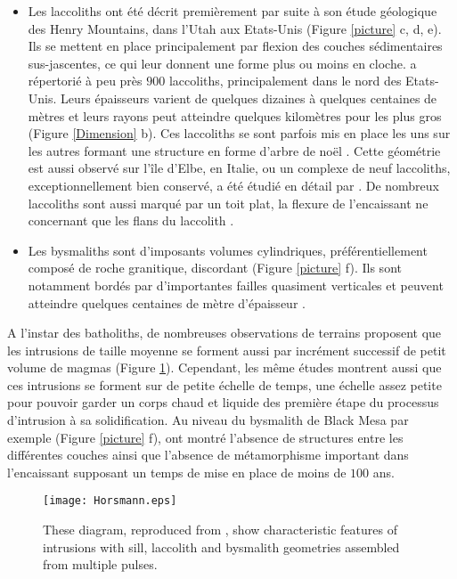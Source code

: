 \begin{itemize}
\item    Les   laccoliths    ont   été    décrit   premièrement    par
  \citet{Gilbert:1877uk}  suite  à  son  étude  géologique  des  Henry
  Mountains, dans  l'Utah aux  Etats-Unis (Figure \ref{picture}  c, d,
  e).  Ils se mettent en  place principalement par flexion des couches
  sédimentaires sus-jascentes, ce  qui leur donnent une  forme plus ou
  moins en  cloche.  \citet{E:2015tl}  a répertorié  à peu  près $900$
  laccoliths,  principalement  dans  le nord  des  Etats-Unis.   Leurs
  épaisseurs  varient de  quelques  dizaines à  quelques centaines  de
  mètres et leurs  rayons peut atteindre quelques  kilomètres pour les
  plus  gros  (Figure  \ref{Dimension}  b).  Ces  laccoliths  se  sont
  parfois mis en place les uns sur les autres formant une structure en
  forme d'arbre  de noël \citep{E:2015tl}.  Cette  géométrie est aussi
  observé  sur  l'île  d'Elbe,  en  Italie, ou  un  complexe  de  neuf
  laccoliths, exceptionnellement bien conservé, a été étudié en détail
  par \citet{Rocchi:2002jy}. De nombreux  laccoliths sont aussi marqué
  par un toit  plat, la flexure de l'encaissant ne  concernant que les
  flans du laccolith \citep{Koch:1981if}.

\item   Les   bysmaliths   sont  d'imposants   volumes   cylindriques,
  préférentiellement composé  de roche granitique,  discordant (Figure
  \ref{picture}  f).   Ils  sont notamment  bordés  par  d'importantes
  failles quasiment verticales et peuvent atteindre quelques centaines
  de mètre d'épaisseur \citep{Johnson:1973ho}.
\end{itemize}

A  l'instar des  batholiths,  de nombreuses  observations de  terrains
proposent que  les intrusions de  taille moyenne se forment  aussi par
incrément     successif     de      petit     volume     de     magmas
\citep{Habert:2004wg,Horsman:2005ct}      (Figure     \ref{Horsmann}).
Cependant,  les  même études  montrent  aussi  que ces  intrusions  se
forment sur de petite échelle de  temps, une échelle assez petite pour
pouvoir  garder  un corps  chaud  et  liquide  des première  étape  du
processus d'intrusion à  sa solidification. Au niveau  du bysmalith de
Black Mesa par exemple (Figure \ref{picture} f), \citet{Habert:2004wg}
ont montré l'absence de structures entre les différentes couches ainsi
que l'absence  de métamorphisme important dans  l'encaissant supposant
un temps de mise en place de moins de $100$ ans.

\begin{figure}
  \begin{center}
    \graphicspath{ {/Users/thorey/Documents/These/Manuscript/Figure/Chapter1/} }
    \texttt{[image: Horsmann.eps]}
    \caption{These  diagram, reproduced  from \citet{Horsman:2009gea},
      show characteristic features of  intrusions with sill, laccolith
      and bysmalith geometries assembled from multiple pulses.}
    \label{Horsmann}
  \end{center}
\end{figure}

